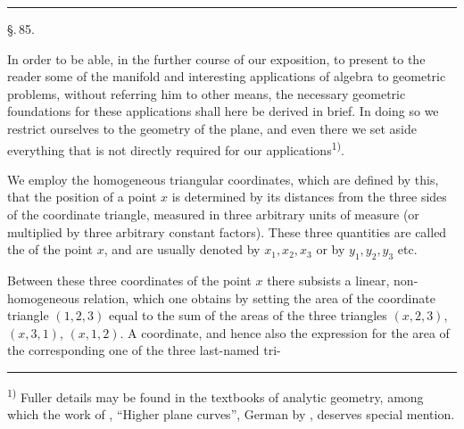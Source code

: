 
\begin{center}

\textbf{}

\noindent\rule{0.25\linewidth}{0.4pt}

\S.\,85.

\end{center}

In order to be able, in the further course of our exposition,
to present to the reader some of the manifold and interesting
applications of algebra to geometric problems, without referring
him to other means, the necessary geometric foundations for
these applications shall here be derived in brief. In doing so we
restrict ourselves to the geometry of the plane, and even there
we set aside everything that is not directly required for our
applications\textsuperscript{1)}.

We employ the homogeneous triangular coordinates, which are
defined by this, that the position of a point $x$ is determined by
its distances from the three sides of the coordinate triangle,
measured in three arbitrary units of measure (or multiplied by
three arbitrary constant factors). These three quantities are called
the  of the point $x$, and are usually denoted
by $x_1, x_2, x_3$ or by $y_1, y_2, y_3$ etc.

Between these three coordinates of the point $x$ there subsists
a linear, non-homogeneous relation, which one obtains by setting
the area of the coordinate triangle $(1, 2, 3)$ equal to the
sum of the areas of the three triangles $(x, 2, 3)$, $(x, 3, 1)$, $(x, 1, 2)$.
A coordinate, and hence also the expression for the
area of the corresponding one of the three last-named tri-

\noindent\rule{0.25\linewidth}{0.4pt}

\footnotesize
\noindent\textsuperscript{1)} Fuller details may be found in the textbooks of analytic
geometry, among which the work of , ``Higher plane
curves'', German by , deserves special mention.
\normalsize
